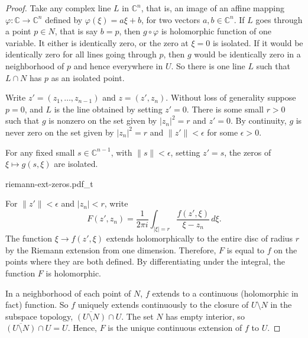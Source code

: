 \documentclass[12pt,openany]{book}
\newcommand{\sabs}[1]{\lvert {#1} \rvert}
\newcommand{\snorm}[1]{\lVert {#1} \rVert}
\newcommand{\abs}[1]{\left\lvert {#1} \right\rvert}
\newcommand{\C}{{\mathbb{C}}}
\theoremstyle{plain}
\theoremstyle{remark}
\theoremstyle{definition}
\theoremstyle{exercise}
\theoremstyle{example}
\newcommand{\exerciseref}[1]{\hyperref[#1]{Exercise~\ref*{#1}}}
\begin{document}
\begin{proof}
Take any complex line $L$ in $\C^n$, that is, an image of an affine mapping
$\varphi \colon \C \to \C^n$ defined by
$\varphi(\xi) = a\xi + b$, for two vectors $a,b \in \C^n$.
If $L$ goes through a point $p \in N$, that is say $b=p$,
then $g \circ \varphi$ is
holomorphic function of one variable.  It either is identically zero, or
the zero at $\xi=0$ is isolated.
If it would be identically zero for all lines going through
$p$, then $g$ would be identically zero in a neighborhood of $p$ and hence
everywhere in $U$.  So there is one line $L$ such that $L \cap N$ has $p$
as an isolated point.

Write $z' =
(z_1,\ldots,z_{n-1})$ and $z=(z',z_n)$.
Without loss of generality suppose $p = 0$, and $L$ is the line
obtained by setting $z' = 0$.
There is some small
$r > 0$ such that $g$ is nonzero on the set
given by $\sabs{z_n}^2 = r$ and $z' = 0$.
By continuity,
$g$ is never zero on the set given by
$\sabs{z_n}^2 = r$ and $\snorm{z'} <\epsilon$ for some $\epsilon >0$.

For any fixed small $s \in \C^{n-1}$, with $\snorm{s} < \epsilon$,
setting $z' = s$,
the zeros of $\xi \mapsto g(s,\xi)$ are isolated.

\begin{center}
{riemann-ext-zeros.pdf_t}
\end{center}

For $\snorm{z'} <
\epsilon$ and $\abs{z_n} < r$, write
\begin{equation*}
F(z',z_n) =
\frac{1}{2\pi i}
\int_{\sabs{\xi}=r} \frac{f(z',\xi)}{\xi-z_n} \,d\xi .
\end{equation*}
The function $\xi \to f(z',\xi)$ extends holomorphically to the entire
disc of radius $r$ by the Riemann extension from one dimension.  Therefore,
$F$ is equal to $f$ on the points where they are both defined.
By differentiating under the integral, the function $F$ is holomorphic.

In a neighborhood of each point of 
$N$, $f$ extends to a continuous (holomorphic in fact) function.
So $f$ uniquely extends continuously to the closure of
$U \setminus N$ in the subspace topology,
$\overline{(U \setminus N)} \cap U$.  The set $N$ has empty interior,
so $\overline{(U \setminus N)} \cap U = U$.  Hence, $F$ is the unique
continuous extension of $f$ to $U$.
\end{proof}
\end{document}
